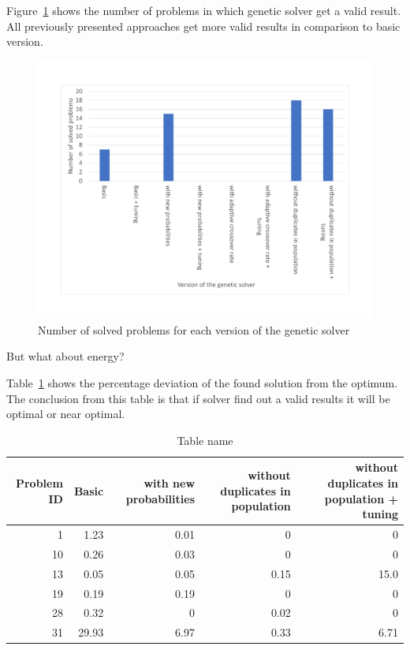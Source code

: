 Figure~\ref{fig:EvaluationNumberOfSolvedProblems} shows the number of problems in which genetic solver get a valid result.
All previously presented approaches get more valid results in comparison to basic version.
\begin{figure}
	\centering
	\includegraphics[width=\textwidth]{images/EvaluationNumberOfSolvedProblems.pdf}
	\caption[Number of problems for each version of the genetic solver]{Number of solved problems for each version of the genetic solver}
	\label{fig:EvaluationNumberOfSolvedProblems}
\end{figure}


But what about energy?


Table~\ref{tab:EnergyTable} shows  the percentage deviation of the found solution from the optimum.
The conclusion from this table is that if solver find out a valid results it will be optimal or near optimal.

\begin{table}
	\begin{tabularx}{\textwidth}{@{}rrrrr@{}}
		\toprule
		\textbf{Problem ID} & \textbf{Basic} &
		\textbf{with new probabilities} & \textbf{without duplicates in population} & \textbf{without duplicates in population + tuning} 
		\tabularnewline
		\midrule
		1 & 1.23 & 0.01 & 0 & 0
		\tabularnewline
		10 & 0.26 & 0.03 & 0 & 0
		\tabularnewline
		13 & 0.05 & 0.05 & 0.15 & 15.0
		\tabularnewline
		19 & 0.19 & 0.19 & 0 & 0
		\tabularnewline
		28 & 0.32 & 0 & 0.02 & 0
		\tabularnewline
		31 & 29.93 & 6.97 & 0.33 & 6.71
		\tabularnewline
		\bottomrule
	\end{tabularx}
	\caption{Table name}\label{tab:EnergyTable}
\end{table}



